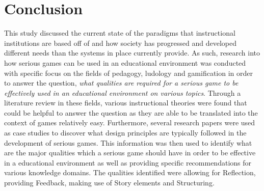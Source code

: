 \documentclass[conference]{IEEEtran}
\begin{document}
\section{Conclusion}
This study discussed the current state of the paradigms that instructional institutions are based off of and how society has progressed and developed different needs than the systems in place currently provide. As such, research into how serious games can be used in an educational environment was conducted with specific focus on the fields of pedagogy, ludology and gamification in order to answer the question, \textit{what qualities are required for a serious game to be effectively used in an educational environment on various topics}. Through a literature review in these fields, various instructional theories were found that could be helpful to answer the question as they are able to be translated into the context of games relatively easy. Furthermore, several research papers were used as case studies to discover what design principles are typically followed in the development of serious games. This information was then used to identify what are the major qualities which a serious game should have in order to be effective in a educational environment as well as providing specific recommendations for various knowledge domains. The qualities identified were allowing for Reflection, providing Feedback, making use of Story elements and Structuring.  


\printbibliography
\end{document}
